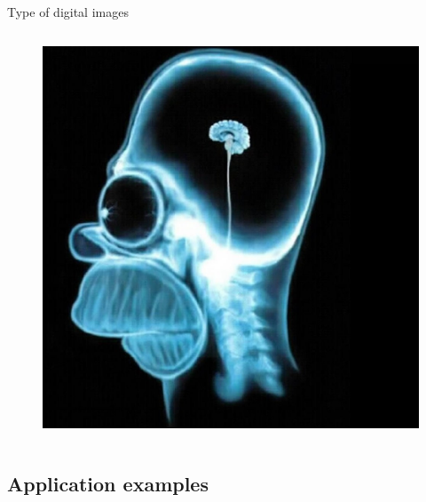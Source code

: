 \documentclass{beamer}
\begin{document}
\begin{frame}
\begin{block}{Type of digital images}
\begin{columns}
\begin{column}{.6\linewidth}
{\begin{figure}
            \includegraphics[width=.7\textwidth]{./images/intro/xray.jpg}
          \end{figure}}
      \end{column}
    \end{columns}    
  \end{block}
\end{frame}

\subsection{Application examples}
\end{document}
